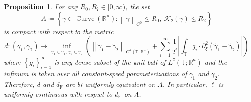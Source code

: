 \documentclass[reqno,centertags,12pt]{amsart}
\newtheorem{proposition}[theorem]{Proposition}
\theoremstyle{definition}
\numberwithin{equation}{section}
\newcommand{\abs}[1]{\left\lvert#1\right\rvert}
\newcommand{\norm}[1]{\left\|#1\right\|}
\newcommand{\set}[1]{\left\{ #1 \right\}}
\newcommand{\setbc}[2]{\left\{ #1\colon#2 \right\}}
\newcommand{\bbR}{{\mathbb{R}}}
\newcommand{\bbT}{{\mathbb{T}}}
\begin{document}
\begin{proposition}\label{PB.3}
    For any $R_{0},R_{2}\in[0,\infty)$, the set
    \[
        A\coloneqq\setbc{\gamma\in\operatorname{Curve}(\bbR^{n})}
        {\norm{\gamma}_{C^{0}} \leq R_{0},\ 
        \mathcal{K}_{2}(\gamma) \leq R_{2}}
    \]
    is compact with respect to the metric
    \[
        d\colon(\gamma_{1},\gamma_{2})
        \mapsto \inf_{\tilde{\gamma}_{1}\in\gamma_{1},
        \tilde{\gamma}_{2}\in\gamma_{2}}
        \left(
            \norm{\tilde{\gamma}_{1} - \tilde{\gamma}_{2}}_{C^{1}(\bbT;\bbR^{n})}
            + \sum_{i=1}^{\infty}\frac{1}{2^{i}}
            \abs{\int_{\bbT}g_{i}\cdot\partial_{\xi}^{2}
            (\tilde{\gamma}_{1} - \tilde{\gamma}_{2})}
        \right)
    \]
    where $\set{g_{i}}_{i=1}^{\infty}$ is any dense subset of the unit ball of
    $L^{2}(\bbT;\bbR^{n})$ and the infimum is taken over all \emph{constant-speed parameterizations}
    of $\gamma_{1}$ and $\gamma_{2}$. Therefore, $d$ and $d_{\mathrm{F}}$ are
    bi-uniformly equivalent on $A$. In particular, $\ell$ is uniformly continuous
    with respect to $d_{\mathrm{F}}$ on $A$.
\end{proposition}
\end{document}
